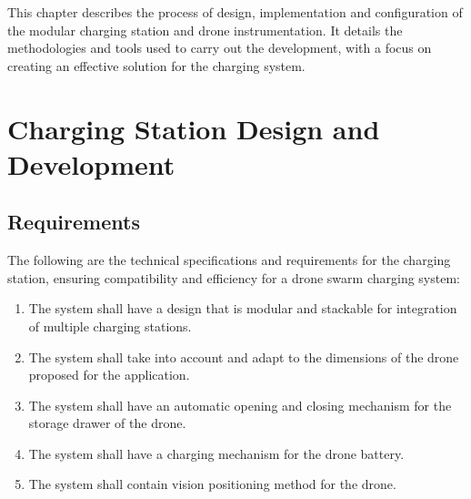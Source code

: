 
This chapter describes the process of design, implementation and configuration of the modular charging station and drone instrumentation. It details the methodologies and tools used to carry out the development, with a focus on creating an effective solution for the charging system.
\section{Charging Station Design and Development}

\subsection{Requirements}
    The following are the technical specifications and requirements for the charging station, ensuring compatibility and efficiency for a drone swarm charging system:     
       \begin{enumerate}
            \item The system shall have a design that is modular and stackable for integration of multiple charging stations. 
            \item The system shall take into account and adapt to the dimensions of the drone proposed for the application.
            \item The system shall have an automatic opening and closing mechanism for the storage drawer of the drone.
            \item The system shall have a charging mechanism for the drone battery.
            \item The system shall contain vision positioning method for the drone.
        \end{enumerate}

